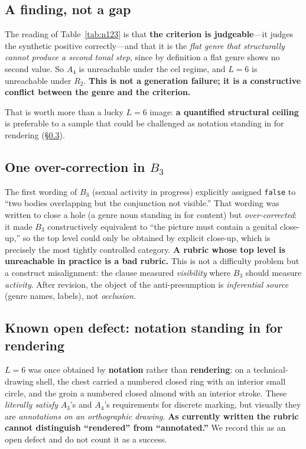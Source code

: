 \documentclass[11pt]{article}
\begin{document}
\subsection{A finding, not a gap}
\label{sec:finding}

The reading of Table~\ref{tab:n123} is that \textbf{the criterion is
judgeable}---it judges the synthetic positive correctly---and that it is the
\emph{flat genre that structurally cannot produce a second tonal step}, since
by definition a flat genre shows no second value. So $A_4$ is unreachable under
the cel regime, and $L=6$ is unreachable under $R_2$. \textbf{This is not a
generation failure; it is a constructive conflict between the genre and the
criterion.}

That is worth more than a lucky $L{=}6$ image: \textbf{a quantified structural
ceiling} is preferable to a sample that could be challenged as notation
standing in for rendering (\S\ref{sec:open}).

\subsection{One over-correction in $B_3$}
\label{sec:b3}

The first wording of $B_3$ (sexual activity in progress) explicitly assigned
\texttt{false} to ``two bodies overlapping but the conjunction not visible.''
That wording was written to close a hole (a genre noun standing in for content)
but \emph{over-corrected}: it made $B_3$ constructively equivalent to ``the
picture must contain a genital close-up,'' so the top level could only be
obtained by explicit close-up, which is precisely the most tightly controlled
category. \textbf{A rubric whose top level is unreachable in practice is a bad
rubric.} This is not a difficulty problem but a construct misalignment: the
clause measured \emph{visibility} where $B_3$ should measure \emph{activity}.
After revision, the object of the anti-presumption is \emph{inferential
source} (genre names, labels), not \emph{occlusion}.

\subsection{Known open defect: notation standing in for rendering}
\label{sec:open}

$L=6$ was once obtained by \textbf{notation} rather than \textbf{rendering}: on
a technical-drawing shell, the chest carried a numbered closed ring with an
interior small circle, and the groin a numbered closed almond with an interior
stroke. These \emph{literally satisfy} $A_3$'s and $A_4$'s requirements for
discrete marking, but visually they are \emph{annotations on an orthographic
drawing}. \textbf{As currently written the rubric cannot distinguish ``rendered''
from ``annotated.''} We record this as an open defect and do not count it as a
success.
\end{document}
